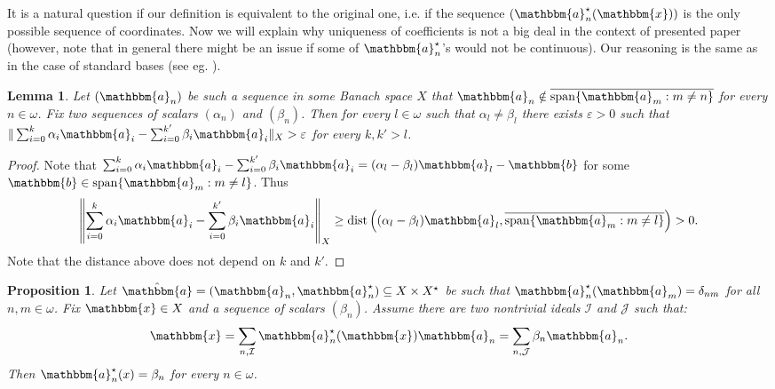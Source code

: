 \documentclass[10pt,a4paper]{amsart}
\newcommand{\on}{\operatorname}
\newcommand{\I}{\mathcal{I}}
\newcommand{\J}{\mathcal{J}}
\newcommand{\w}{\mathbbm}
\newtheorem{lemma}[theorem]{Lemma}
\newtheorem{proposition}[theorem]{Proposition}
\begin{document}
It is a natural question if our definition is equivalent to the original one, i.e. if the sequence $(\w{a}_n^\star (\w{x}))$ is the only possible sequence of coordinates. Now we will explain why uniqueness of coefficients is not a big deal in the context of presented paper (however, note that in general there might be an issue if some of $\w{a}_n^\star$'s would not be continuous). Our reasoning is the same as in the case of standard bases (see eg. \cite[Definition 1.1.2, Theorem 1.1.3]{AK}).

\begin{lemma}
\label{L:wspolczynniki}
Let $(\w{a}_n)$ be such a sequence in some Banach space $X$ that $\w{a}_n\notin \overline{\on{span}\{\w{a}_m:m \neq n\}}$ for every $n \in \omega$. Fix two sequences of scalars $(\alpha_n)$ and $(\beta_n)$. Then for every $l\in \omega$ such that $\alpha_l\neq \beta_l$ there exists $\varepsilon>0$ such that $\|\sum_{i=0}^k \alpha_i\w{a}_i - \sum_{i=0}^{k'} \beta_i\w{a}_i\|_X>\varepsilon$ for every $k,k'>l$.
\end{lemma}

\begin{proof}
Note that $\sum_{i=0}^k \alpha_i\w{a}_i - \sum_{i=0}^{k'} \beta_i\w{a}_i=(\alpha_l-\beta_l)\w{a}_l-\w{b}$ for some $\w{b}\in \on{span}\{\w{a}_m:m \neq l\}$. Thus
\[
\left\|\sum_{i=0}^k \alpha_i\w{a}_i - \sum_{i=0}^{k'} \beta_i\w{a}_i\right\|_X\geq \on{dist}\left((\alpha_l-\beta_l)\w{a}_l, \overline{\on{span}\{\w{a}_m:m \neq l\}}\right)>0.
\]
Note that the distance above does not depend on $k$ and $k'$. 
\end{proof}

\begin{proposition}
\label{P:wspolczynniki}
Let $\hat{\w{a}}=(\w{a}_n,\w{a}^\star_n)\subseteq X\times X^\star$ be such that $\w{a}^\star_n(\w{a}_m)=\delta_{nm}$ for all $n,m\in\omega$. Fix $\w{x}\in X$ and a sequence of scalars $(\beta_n)$. Assume there are two nontrivial ideals $\I$ and $\J$ such that:
\[
\w{x}=\sum_{n,\I} \w{a}^\star_n(\w{x}) \w{a}_n= \sum_{n,\J} \beta_n \w{a}_n.
\]
Then $\w{a}_n^\star(x)=\beta_n$ for every $n\in \omega$. 
\end{proposition}
\end{document}
